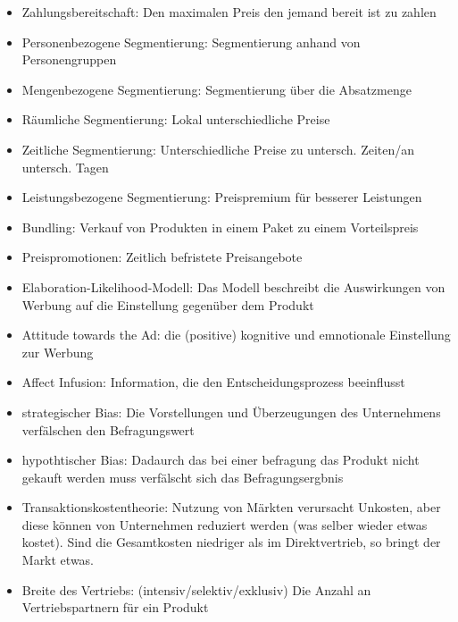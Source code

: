 \documentclass[]{article}
\begin{document}
\begin{itemize}
    \item Zahlungsbereitschaft: Den maximalen Preis den jemand bereit ist zu zahlen
    \item Personenbezogene Segmentierung: Segmentierung anhand von Personengruppen
    \item Mengenbezogene Segmentierung: Segmentierung über die Absatzmenge
    \item Räumliche Segmentierung: Lokal unterschiedliche Preise
    \item Zeitliche Segmentierung: Unterschiedliche Preise zu untersch. Zeiten/an untersch. Tagen
    \item Leistungsbezogene Segmentierung: Preispremium für besserer Leistungen
    \item Bundling: Verkauf von Produkten in einem Paket zu einem Vorteilspreis
    \item Preispromotionen: Zeitlich befristete Preisangebote
    \item Elaboration-Likelihood-Modell: Das Modell beschreibt die Auswirkungen von Werbung auf die Einstellung gegenüber dem Produkt
    \item Attitude towards the Ad: die (positive) kognitive und emnotionale Einstellung zur Werbung
    \item Affect Infusion: Information, die den Entscheidungsprozess beeinflusst
    \item strategischer Bias: Die Vorstellungen und Überzeugungen des Unternehmens verfälschen den Befragungswert
    \item hypothtischer Bias: Dadaurch das bei einer befragung das Produkt nicht gekauft werden muss verfälscht sich das Befragungsergbnis
    \item Transaktionskostentheorie: Nutzung von Märkten verursacht Unkosten, aber diese können von Unternehmen reduziert werden (was selber wieder etwas kostet). Sind die Gesamtkosten niedriger als im Direktvertrieb, so bringt der Markt etwas.
    \item Breite des Vertriebs: (intensiv/selektiv/exklusiv) Die Anzahl an Vertriebspartnern für ein Produkt
\end{itemize}

\newpage

 














\end{document}
